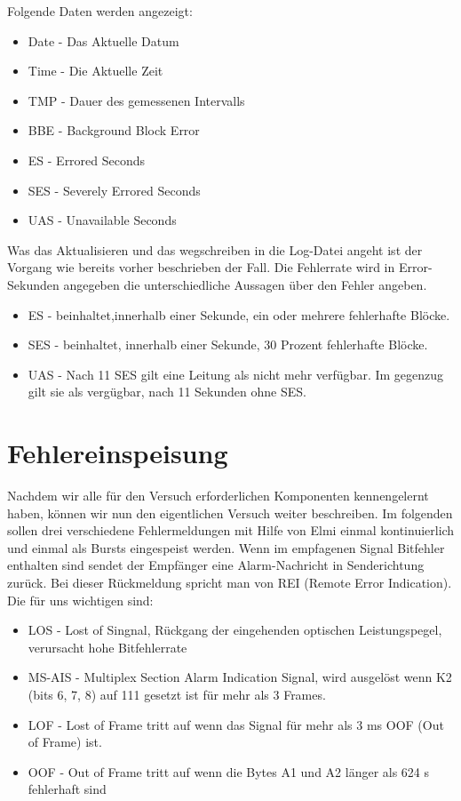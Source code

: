 Folgende Daten werden angezeigt:

\begin{itemize}
\item Date - Das Aktuelle Datum
\item Time - Die Aktuelle Zeit
\item TMP - Dauer des gemessenen Intervalls
\item BBE - Background Block Error
\item ES - Errored Seconds
\item SES - Severely Errored Seconds
\item UAS - Unavailable Seconds
\end{itemize}

Was das Aktualisieren und das wegschreiben in die Log-Datei angeht ist der Vorgang wie bereits vorher beschrieben der Fall. 
Die Fehlerrate wird in Error-Sekunden angegeben die unterschiedliche Aussagen über den Fehler angeben.

\begin{itemize}
\item ES - beinhaltet,innerhalb einer Sekunde, ein oder mehrere fehlerhafte Blöcke. 
\item SES - beinhaltet, innerhalb einer Sekunde, 30 Prozent fehlerhafte Blöcke.
\item UAS - Nach 11 SES gilt eine Leitung als nicht mehr verfügbar. Im gegenzug gilt sie als vergügbar, nach 11 Sekunden ohne SES.
\end{itemize}




\section{Fehlereinspeisung}
Nachdem wir alle für den Versuch erforderlichen Komponenten kennengelernt haben, können wir nun den eigentlichen Versuch weiter beschreiben. Im folgenden sollen drei verschiedene Fehlermeldungen mit Hilfe von Elmi einmal kontinuierlich und einmal als Bursts eingespeist werden. Wenn im empfagenen Signal Bitfehler enthalten sind sendet der Empfänger eine Alarm-Nachricht in Senderichtung zurück. Bei dieser Rückmeldung spricht man von REI (Remote Error Indication). Die für uns wichtigen sind:

\begin{itemize}
\item LOS - Lost of Singnal, Rückgang der eingehenden optischen Leistungspegel, verursacht hohe Bitfehlerrate
\item MS-AIS - Multiplex Section Alarm Indication Signal, wird ausgelöst wenn K2 (bits 6, 7, 8) auf 111 gesetzt ist für mehr als 3 Frames.
\item LOF - Lost of Frame tritt auf wenn das Signal für mehr als 3 ms OOF (Out of Frame) ist.
\item OOF - Out of Frame tritt auf wenn die Bytes A1 und A2 länger als 624 \mu s  fehlerhaft sind
\end{itemize}

